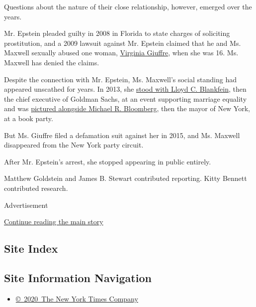Questions about the nature of their close relationship, however, emerged
over the years.

Mr. Epstein pleaded guilty in 2008 in Florida to state charges of
soliciting prostitution, and a 2009 lawsuit against Mr. Epstein claimed
that he and Ms. Maxwell sexually abused one woman,
\href{https://www.nytimes.com/2019/08/09/nyregion/epstein-sex-slave-documents.html}{Virginia
Giuffre}, when she was 16. Ms. Maxwell has denied the claims.

Despite the connection with Mr. Epstein, Ms. Maxwell's social standing
had appeared unscathed for years. In 2013, she
\href{https://bfa.com/home/photo/679638?term=ghislaine\%20maxwell}{stood
with Lloyd C. Blankfein}, then the chief executive of Goldman Sachs, at
an event supporting marriage equality and was
\href{https://bfa.com/home/photo/852481?term=ghislaine\%20maxwell}{pictured
alongside Michael R. Bloomberg}, then the mayor of New York, at a book
party.

But Ms. Giuffre filed a defamation suit against her in 2015, and Ms.
Maxwell disappeared from the New York party circuit.

After Mr. Epstein's arrest, she stopped appearing in public entirely.

Matthew Goldstein and James B. Stewart contributed reporting. Kitty
Bennett contributed research.

Advertisement

\protect\hyperlink{after-bottom}{Continue reading the main story}

\hypertarget{site-index}{%
\subsection{Site Index}\label{site-index}}

\hypertarget{site-information-navigation}{%
\subsection{Site Information
Navigation}\label{site-information-navigation}}

\begin{itemize}
\tightlist
\item
  \href{https://help.nytimes.com/hc/en-us/articles/115014792127-Copyright-notice}{©~2020~The
  New York Times Company}
\end{itemize}

